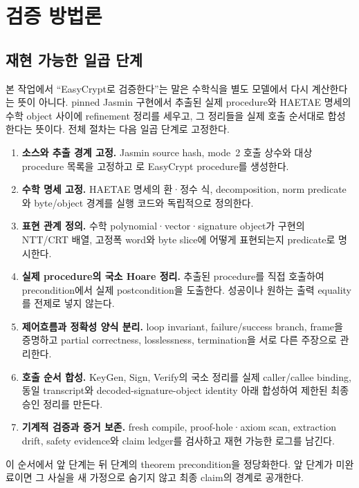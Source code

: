 \section{검증 방법론}
\label{sec:methodology}

\subsection{재현 가능한 일곱 단계}

본 작업에서 ``EasyCrypt로 검증한다''는 말은 수학식을 별도 모델에서 다시
계산한다는 뜻이 아니다. pinned Jasmin 구현에서 추출된 실제 procedure와
HAETAE 명세의 수학 object 사이에 refinement 정리를 세우고, 그 정리들을 실제
호출 순서대로 합성한다는 뜻이다. 전체 절차는 다음 일곱 단계로 고정한다.

\begin{enumerate}
  \item \textbf{소스와 추출 경계 고정.}
        Jasmin source hash, mode~2 호출 상수와 대상 procedure 목록을 고정하고
        로 EasyCrypt procedure를 생성한다.
  \item \textbf{수학 명세 고정.}
        HAETAE 명세의 환·정수 식, decomposition, norm predicate와 byte/object
        경계를 실행 코드와 독립적으로 정의한다.
  \item \textbf{표현 관계 정의.}
        수학 polynomial·vector·signature object가 구현의 NTT/CRT 배열,
        고정폭 word와 byte slice에 어떻게 표현되는지 predicate로 명시한다.
  \item \textbf{실제 procedure의 국소 Hoare 정리.}
        추출된 procedure를 직접 호출하여 precondition에서 실제 postcondition을
        도출한다. 성공이나 원하는 출력 equality를 전제로 넣지 않는다.
  \item \textbf{제어흐름과 정확성 양식 분리.}
        loop invariant, failure/success branch, frame을 증명하고 partial
        correctness, losslessness, termination을 서로 다른 주장으로 관리한다.
  \item \textbf{호출 순서 합성.}
        KeyGen, Sign, Verify의 국소 정리를 실제 caller/callee binding, 동일
        transcript와 decoded-signature-object identity 아래 합성하여 제한된
        최종 승인 정리를 만든다.
  \item \textbf{기계적 검증과 증거 보존.}
        fresh compile, proof-hole·axiom scan, extraction drift, safety evidence와
        claim ledger를 검사하고 재현 가능한 로그를 남긴다.
\end{enumerate}

이 순서에서 앞 단계는 뒤 단계의 theorem precondition을 정당화한다. 앞 단계가
미완료이면 그 사실을 새 가정으로 숨기지 않고 최종 claim의 경계로 공개한다.

